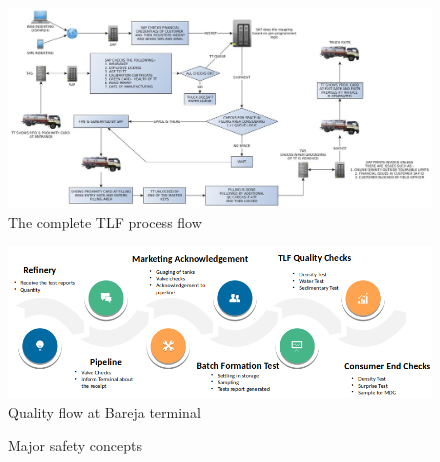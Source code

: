 \documentclass{report}
\begin{document}
	\pagebreak
	\begin{landscape}
		\begin{figure}[h]
			\centering
			\includegraphics[width=\linewidth]{distribution_flow}
			\caption{The complete TLF process flow}
			\label{distribution_flow}
		\end{figure}
	\end{landscape}
	\pagebreak
	\begin{figure}[h]
		\centering
		\includegraphics[width=\linewidth]{bareja_quality_flow}
		\caption{Quality flow at Bareja terminal}
		\label{bareja_quality_flow}
	\end{figure}
		\begin{figure}[h]
		\centering
		\caption{Major safety concepts}
		\label{major_safety_concepts}
		\end{figure}
\end{document}
